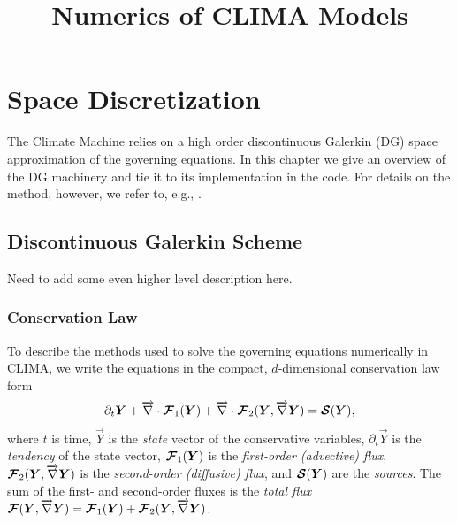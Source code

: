 \documentclass{report}
\title{Numerics of CLIMA Models}
\numberwithin{equation}{section}
\begin{document}
\maketitle
\tableofcontents

\chapter{Space Discretization}
The Climate Machine relies on a high order discontinuous Galerkin (DG) space approximation of the governing equations. 
In this chapter we give an overview of the DG machinery and tie it to its implementation in the code. For details on the method, however, we refer to, e.g., \cite{bassi:1997ee, hesthaven:2008}.

\section{Discontinuous Galerkin Scheme}

Need to add some even higher level description here.

\subsection{Conservation Law}

To describe the methods used to solve the governing equations numerically in CLIMA, we write the equations in the compact, $d$-dimensional conservation law form 
\begin{equation}\label{eq:advection_diffusion_source}
    \partial_t \boldsymbol{{Y}} 
    + \overrightarrow{\nabla} \cdot \boldsymbol{{\mathcal{F}}}_1 (\boldsymbol{{Y}}) 
    + \overrightarrow{\nabla} \cdot \boldsymbol{{\mathcal{F}}}_2 (\boldsymbol{{Y}}, \overrightarrow{\nabla} \boldsymbol{{Y}}) 
    = \boldsymbol{{\mathcal{S}}}(\boldsymbol{{Y}}),
\end{equation}
where $t$ is time, $\vec Y$ is the \emph{state} vector of the conservative variables, $\partial_t \vec{Y}$ is the \emph{tendency} of the state vector, $\boldsymbol{{\mathcal{F}}}_1 (\boldsymbol{{Y}})$ is the \emph{first-order (advective) flux}, $\boldsymbol{{\mathcal{F}}}_2 (\boldsymbol{{Y}}, \overrightarrow{\nabla} \boldsymbol{{Y}})$ is the \emph{second-order (diffusive) flux}, and $\boldsymbol{{\mathcal{S}}}(\boldsymbol{{Y}})$ are the \emph{sources}. The sum of the first- and second-order fluxes is the \emph{total flux}  $\boldsymbol{{\mathcal{F}}}(\boldsymbol{{Y}}, \overrightarrow{\nabla} \boldsymbol{{Y}}) = \boldsymbol{{\mathcal{F}}}_1(\boldsymbol{{Y}}) + \boldsymbol{{\mathcal{F}}}_2(\boldsymbol{{Y}}, \overrightarrow{\nabla} \boldsymbol{{Y}})$.
\end{document}
